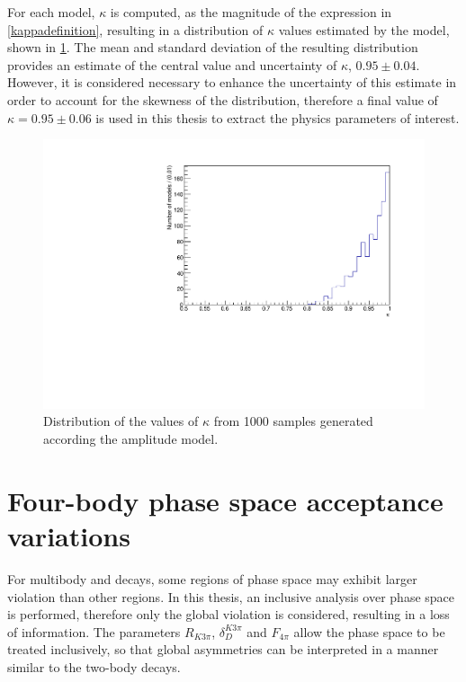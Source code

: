 For each model, $\kappa$ is computed, as the magnitude of the expression in \eqn\ref{kappadefinition}, resulting in a distribution of $\kappa$ values estimated by the model, shown in \fig\ref{kappadistribution}. The mean and standard deviation of the resulting distribution provides an estimate of the central value and uncertainty of $\kappa$,  $0.95 \pm 0.04$. However, it is considered necessary to enhance the uncertainty of this estimate in order to account for the skewness of the distribution, therefore a final value of $\kappa = 0.95 \pm 0.06$ is used in this thesis to extract the physics parameters of interest.

\begin{figure}[h]
\centering
\includegraphics[trim = 0mm 0mm 0mm 8mm, clip, width=0.5\linewidth]{figures/results/kappa.pdf}
\caption{Distribution of the values of $\kappa$ from 1000 samples generated according the amplitude model.}
\label{kappadistribution}
\end{figure}

\section{Four-body phase space acceptance variations}
\label{sec:interpretation:inputs}

For multibody \decay{\Dz}{\Kmp\pipm\pimp\pipm} and \decay{\Dz}{\pip\pim\pip\pim} decays, some regions of phase space may exhibit larger \CP violation than other regions. In this thesis, an inclusive analysis over phase space is performed, therefore only the global \CP violation is considered, resulting in a loss of information. The parameters $R_{K3\pi}$, $\delta_D^{K3\pi}$ and $F_{4\pi}$ allow the phase space to be treated inclusively, so that global asymmetries can be interpreted in a manner similar to the two-body \Dz decays.

